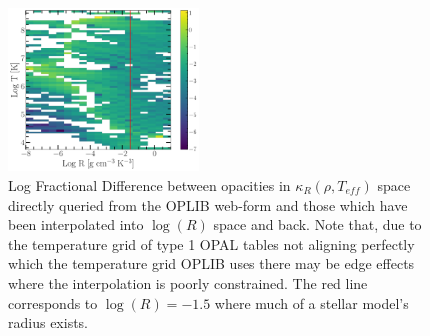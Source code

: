 \begin{figure}
	\centering
	\includegraphics[width=0.45\textwidth]{FractionalDifference.pdf}
	\caption{Log Fractional Difference between opacities in $\kappa_{R}(\rho,
	T_{eff})$ space directly queried from the OPLIB web-form and those which
	have been interpolated into $\log(R)$ space and back. Note that, due to the
	temperature grid of type 1 OPAL tables not aligning perfectly which the temperature
	grid OPLIB uses there may be edge effects where the interpolation is poorly
	constrained. The red line corresponds to $\log(R) = -1.5$ where much of a
	stellar model's radius exists.}
	\label{fig:fracdiff}
\end{figure}

